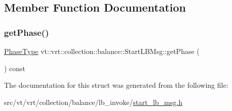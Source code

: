 \subsection{Member Function Documentation}
\mbox{\label{structvt_1_1vrt_1_1collection_1_1balance_1_1_start_l_b_msg_ac932d065333978204f0afbc441a23b87}} 
\subsubsection{\texorpdfstring{get\+Phase()}{getPhase()}}
{\footnotesize\ttfamily \hyperlink{namespacevt_a46ce6733d5cdbd735d561b7b4029f6d7}{Phase\+Type} vt\+::vrt\+::collection\+::balance\+::\+Start\+L\+B\+Msg\+::get\+Phase (\begin{DoxyParamCaption}{ }\end{DoxyParamCaption}) const\hspace{0.3cm}{\ttfamily [inline]}}



The documentation for this struct was generated from the following file\+:\begin{DoxyCompactItemize}
\item 
src/vt/vrt/collection/balance/lb\+\_\+invoke/\hyperlink{start__lb__msg_8h}{start\+\_\+lb\+\_\+msg.\+h}\end{DoxyCompactItemize}
